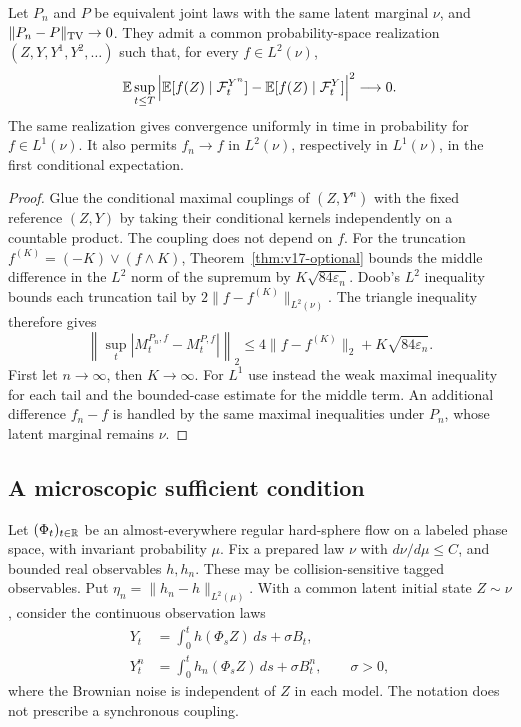 \begin{corollary}
\label{cor:v17-changing}
Let $P_n$ and $P$ be equivalent joint laws with the same latent
marginal $\nu$, and $\|P_n-P\|_{\rm TV}\to0$. They admit a common
probability-space realization $(Z,Y,Y^1,Y^2,\ldots)$ such that, for
every $f\in L^2(\nu)$,
\[
 \mathbb E\sup_{t\le T}
 \left|\mathbb E[f(Z)\mid\mathcal F^{Y^n}_t]
             -\mathbb E[f(Z)\mid\mathcal F^Y_t]\right|^2\longrightarrow0.
\]
The same realization gives convergence uniformly in time in
probability for $f\in L^1(\nu)$. It also permits $f_n\to f$ in
$L^2(\nu)$, respectively in $L^1(\nu)$, in the first conditional
expectation.
\end{corollary}
\begin{proof}
Glue the conditional maximal couplings of $(Z,Y^n)$ with the fixed
reference $(Z,Y)$ by taking their conditional kernels independently
on a countable product. The coupling does not depend on $f$.
For the truncation $f^{(K)}=(-K)\vee(f\wedge K)$,
Theorem~\ref{thm:v17-optional} bounds the middle difference in the
$L^2$ norm of the supremum by $K\sqrt{84\varepsilon_n}$.
Doob's $L^2$ inequality bounds each truncation tail by
$2\|f-f^{(K)}\|_{L^2(\nu)}$. The triangle inequality therefore gives
\[
 \left\|\sup_t|M^{P_n,f}_t-M^{P,f}_t|\right\|_2
 \le4\|f-f^{(K)}\|_2+K\sqrt{84\varepsilon_n}.
\]
First let $n\to\infty$, then $K\to\infty$. For $L^1$ use instead
the weak maximal inequality for each tail and the bounded-case
estimate for the middle term. An additional difference $f_n-f$ is
handled by the same maximal inequalities under $P_n$, whose latent
marginal remains $\nu$.
\end{proof}

\subsection{A microscopic sufficient condition}
Let $(\Phi_t)_{t\in\mathbb R}$ be an almost-everywhere regular hard-sphere
flow on a labeled phase space, with invariant probability $\mu$.
Fix a prepared law $\nu$ with $d\nu/d\mu\le C$, and bounded real
observables $h,h_n$. These may be collision-sensitive tagged
observables. Put $\eta_n=\|h_n-h\|_{L^2(\mu)}$. With a common latent
initial state $Z\sim\nu$, consider the continuous observation laws
\begin{align*}
 Y_t&=\int_0^t h(\Phi_s Z)\,ds+\sigma B_t,\\
 Y^n_t&=\int_0^t h_n(\Phi_s Z)\,ds+\sigma B^n_t,
 \qquad \sigma>0,
\end{align*}
where the Brownian noise is independent of $Z$ in each model. The
notation does not prescribe a synchronous coupling.

